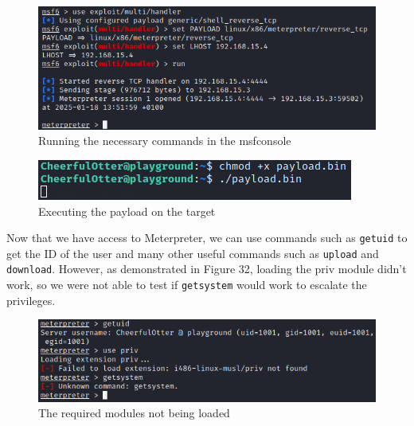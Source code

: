\documentclass[a4paper]{article}
\newcommand{\abc}{\hfill \break}
\begin{document}
\begin{figure}[ht]
	\includegraphics[scale=0.5]{images/msfc.png}
	\centering
	\caption{Running the necessary commands in the msfconsole}
\end{figure}
\begin{figure}[h]
	\includegraphics[scale=0.8]{images/ep.png}
	\centering
	\caption{Executing the payload on the target}
\end{figure}\abc
Now that we have access to Meterpreter, we can use commands such as \texttt{getuid} to get the ID of the user and many other useful commands such as \texttt{upload} and \texttt{download}. However, as demonstrated in Figure 32, loading the priv module didn't work, so we were not able to test if \texttt{getsystem} would work to escalate the privileges.
\begin{figure}[h]
	\includegraphics[scale=0.51]{images/RadagJuice.png}
	\centering
	\caption{The required modules not being loaded}
\end{figure}\abc
\newpage
\end{document}
